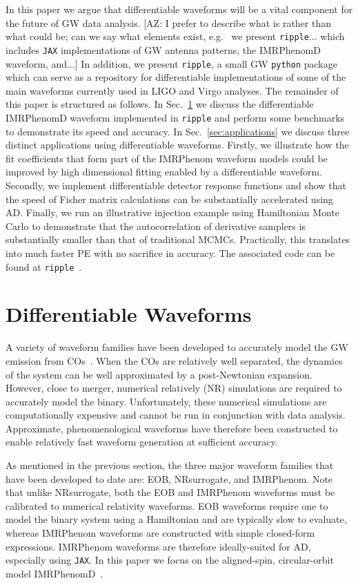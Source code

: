 \documentclass[twocolumn]{aastex631}
\newcommand{\jax}{\texttt{JAX}\xspace}
\newcommand{\ripple}{\texttt{ripple}\xspace}
\newcommand{\AZ}[1]{{\color{Burnt}[AZ: #1]}}
\begin{document}
In this paper we argue that differentiable waveforms will be a vital component for the future of GW data analysis.
\AZ{I prefer to describe what is rather than what could be; can we say what elements exist, e.g.~
we present \ripple... which includes \jax implementations of GW antenna patterns, the IMRPhenomD waveform, and...}
In addition, we present \ripple, a small GW \texttt{python} package which can serve as a repository for differentiable implementations of some of the main waveforms currently used in LIGO and Virgo analyses. 
The remainder of this paper is structured as follows. 
In Sec.~\ref{sec:waveforms} we discuss the differentiable IMRPhenomD waveform implemented in \ripple and perform some benchmarks to demonstrate its speed and accuracy. 
In Sec.~\ref{sec:applications} we discuss three distinct applications using differentiable waveforms. 
Firstly, we illustrate how the fit coefficients that form part of the IMRPhenom waveform models could be improved by high dimensional fitting enabled by a differentiable waveform. 
Secondly, we implement differentiable detector response functions and show that the speed of Fisher matrix calculations can be substantially accelerated using AD.
Finally, we run an illustrative injection example using Hamiltonian Monte Carlo to demonstrate that the autocorrelation of derivative samplers is substantially smaller than that of traditional MCMCs.
Practically, this translates into much faster PE with no sacrifice in accuracy.
The associated code can be found at \ripple~\citep{ripple}.

\section{Differentiable Waveforms}
\label{sec:waveforms}

A variety of waveform families have been developed to accurately model the GW emission from COs~\citep{Schmidtreview}. 
When the COs are relatively well separated, the dynamics of the system can be well approximated by a post-Newtonian expansion.
However, close to merger, numerical relatively (NR) simulations are required to accurately model the binary.
Unfortunately, these numerical simulations are computationally expensive and cannot be run in conjunction with data analysis.
Approximate, phenomenological waveforms have therefore been constructed to enable relatively fast waveform generation at sufficient accuracy.

As mentioned in the previous section, the three major waveform families that have been developed to date are:  EOB,  NRsurrogate, and IMRPhenom.
Note that unlike NRsurrogate, both the EOB and IMRPhenom waveforms must be calibrated to numerical relativity waveforms.
EOB waveforms require one to model the binary system using a Hamiltonian and are typically slow to evaluate, whereas IMRPhenom waveforms are constructed with simple closed-form expressions.
IMRPhenom waveforms are therefore ideally-suited for AD, especially using \jax. 
In this paper we focus on the aligned-spin, circular-orbit model IMRPhenomD~\citep{Husa:2015iqa, Khan:2015jqa}.
\end{document}
